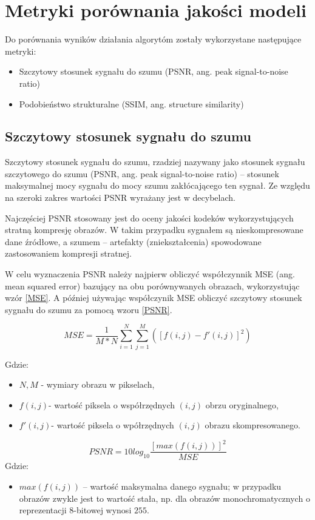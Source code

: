 \documentclass[a4paper,12pt,twoside,openany]{report}
\begin{document}
\section{Metryki porównania jakości modeli}
Do porównania wyników działania algorytóm zostały wykorzystane następujące metryki:
\begin{itemize}
	\item Szczytowy stosunek sygnału do szumu (PSNR, ang. peak signal-to-noise ratio)
	\item Podobieństwo strukturalne (SSIM, ang. structure similarity) 
\end{itemize}
\subsection{Szczytowy stosunek sygnału do szumu}
Szczytowy stosunek sygnału do szumu, rzadziej nazywany jako stosunek sygnału szczytowego do szumu (PSNR, ang. peak signal-to-noise ratio) – stosunek maksymalnej mocy sygnału do mocy szumu zakłócającego ten sygnał. Ze względu na szeroki zakres wartości PSNR wyrażany jest w decybelach. 

Najczęściej PSNR stosowany jest do oceny jakości kodeków wykorzystujących stratną kompresję obrazów. W takim przypadku sygnałem są nieskompresowane dane źródłowe, a szumem – artefakty (zniekształcenia) spowodowane zastosowaniem kompresji stratnej.

W celu wyznaczenia PSNR należy najpierw obliczyć współczynnik MSE (ang. mean squared error) bazujący na obu porównywanych obrazach, wykorzystując wzór \ref{MSE}. A później używając współczynik MSE obliczyć szczytowy stosunek sygnału do szumu za pomocą wzoru \ref{PSNR}. 

\begin{equation}
	MSE= \frac{1}{M*N} \sum_{i=1}^{N} \sum_{j=1}^{M} ([f(i,j)-f'(i,j)]^2) \label{MSE}
\end{equation}

Gdzie:
\begin{itemize}
	\item $N,M$ - wymiary obrazu w pikselach,
	\item $f(i,j)$- wartość piksela o współrzędnych $(i,j)$ obrzu oryginalnego,
	\item $f'(i,j)$- wartość piksela o wpółrzędnych $(i,j)$ obrazu skompresowanego.
\end{itemize}

\begin{equation}
	PSNR= 10 log_{10}{\frac{[max(f(i,j))]^2}{MSE}}
	\label{PSNR}
\end{equation}
Gdzie: 
\begin{itemize}
	\item $max(f(i,j))$ – wartość maksymalna danego sygnału; w przypadku obrazów zwykle jest to wartość stała, np. dla obrazów monochromatycznych o reprezentacji 8-bitowej wynosi $255$.
\end{itemize}
\end{document}
